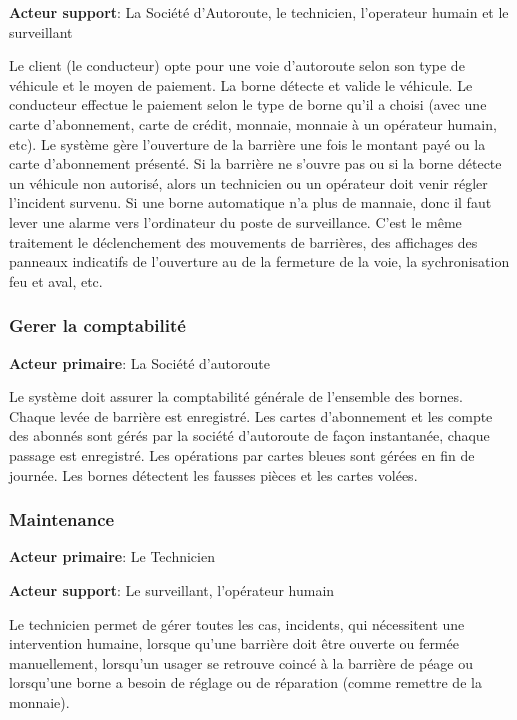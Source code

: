 \textbf{Acteur support}: La Société d’Autoroute, le technicien, l’operateur humain et le surveillant

Le client (le conducteur) opte pour une voie d’autoroute selon son type de véhicule et le moyen de paiement. La borne détecte et valide le véhicule. Le conducteur effectue le paiement selon le type de borne qu’il a choisi (avec une carte d’abonnement, carte de crédit, monnaie, monnaie à un opérateur humain, etc). Le système gère l’ouverture de la barrière une fois le montant payé ou la carte d’abonnement présenté. Si la barrière ne s’ouvre pas ou si la borne détecte un véhicule non autorisé, alors un technicien ou un opérateur doit venir régler l’incident survenu. Si une borne automatique n'a plus de mannaie, donc il faut lever une alarme vers l'ordinateur du poste de surveillance. C'est le même traitement le déclenchement des mouvements de barrières, des affichages des panneaux indicatifs de l'ouverture au de la fermeture de la voie, la sychronisation feu et aval, etc.

\subsubsection{\textbf{Gerer la comptabilité}} \label{subsubsec:gerer}
\textbf{Acteur primaire}: La Société d'autoroute 

Le système doit assurer la comptabilité générale de l’ensemble des bornes. Chaque levée de barrière est enregistré. Les cartes d’abonnement et les compte des abonnés sont gérés par la société d’autoroute de façon instantanée, chaque passage est enregistré. Les opérations par cartes bleues sont gérées en fin de journée. Les bornes détectent les fausses pièces et les cartes volées.

\subsubsection{\textbf{ Maintenance}} \label{subsubsec:maint}
\textbf{Acteur primaire}: Le Technicien 

\textbf{Acteur support}: Le surveillant, l’opérateur humain

Le technicien permet de gérer toutes les cas, incidents, qui nécessitent une intervention humaine, lorsque qu’une barrière doit être ouverte ou fermée manuellement, lorsqu’un usager se retrouve coincé à la barrière de péage ou lorsqu’une borne a besoin de réglage ou de réparation (comme remettre de la monnaie).